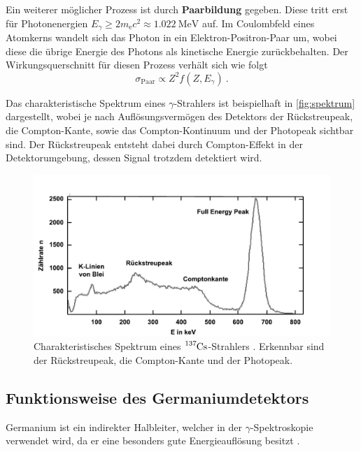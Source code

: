 Ein weiterer möglicher Prozess ist durch \textbf{Paarbildung} gegeben.
Diese tritt erst für Photonenergien $E_{\gamma} \geq 2 m_\text{e} c^2 \approx \SI{1.022}{\mega\eV}$ auf.
Im Coulombfeld eines Atomkerns wandelt sich das Photon in ein Elektron-Positron-Paar um,
wobei diese die übrige Energie des Photons als kinetische Energie zurückbehalten.
Der Wirkungsquerschnitt für diesen Prozess verhält sich wie folgt
\begin{equation*}
    \sigma_\text{Paar} \propto Z^2 f(Z, E_{\gamma}) \ .
\end{equation*}

Das charakteristische Spektrum eines $\gamma$-Strahlers ist beispielhaft in \autoref{fig:spektrum} dargestellt,
wobei je nach Auflösungsvermögen des Detektors der Rückstreupeak,
die Compton-Kante,
sowie das Compton-Kontinuum und der Photopeak sichtbar sind.
Der Rückstreupeak entsteht dabei durch Compton-Effekt in der Detektorumgebung,
dessen Signal trotzdem detektiert wird.
\begin{figure}
    \centering
    \includegraphics[width=\textwidth]{content/img/cs137-spektrum_Leifi.pdf}
    \caption{Charakteristisches Spektrum eines $\ce{^{137}Cs}$-Strahlers \cite{caesium}.
    Erkennbar sind der Rückstreupeak,
    die Compton-Kante und der Photopeak.}
    \label{fig:spektrum}
\end{figure}

\subsection{Funktionsweise des Germaniumdetektors}
\label{sec:funktionsweise}

Germanium ist ein indirekter Halbleiter,
welcher in der $\gamma$-Spektroskopie verwendet wird,
da er eine besonders gute Energieauflösung besitzt \cite{kolanoskiwermes}.

